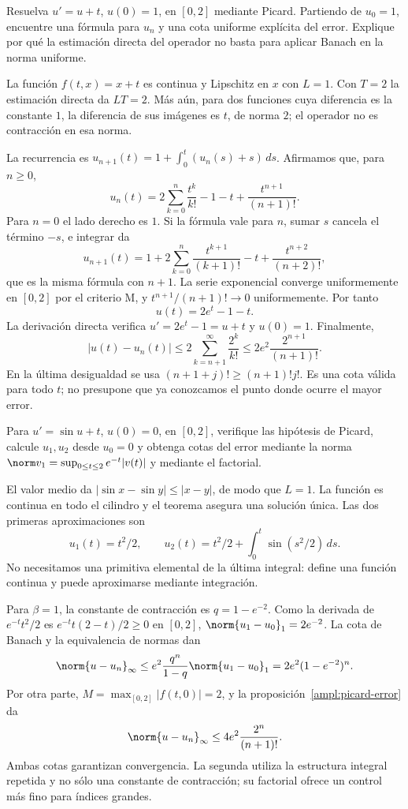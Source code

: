 \begin{ejercicio}\label{ej:ampl-picard-1}
Resuelva $u'=u+t$, $u(0)=1$, en $[0,2]$ mediante Picard. Partiendo de $u_0=1$, encuentre una fórmula para $u_n$ y una cota uniforme explícita del error. Explique por qué la estimación directa del operador no basta para aplicar Banach en la norma uniforme.
\end{ejercicio}
\begin{solucion}
La función $f(t,x)=x+t$ es continua y Lipschitz en $x$ con $L=1$. Con $T=2$ la estimación directa da $LT=2$. Más aún, para dos funciones cuya diferencia es la constante $1$, la diferencia de sus imágenes es $t$, de norma $2$; el operador no es contracción en esa norma.

La recurrencia es $u_{n+1}(t)=1+\int_0^t(u_n(s)+s)\,ds$. Afirmamos que, para $n\ge0$,
\[
 u_n(t)=2\sum_{k=0}^n\frac{t^k}{k!}-1-t+\frac{t^{n+1}}{(n+1)!}.
\]
Para $n=0$ el lado derecho es $1$. Si la fórmula vale para $n$, sumar $s$ cancela el término $-s$, e integrar da
\[
 u_{n+1}(t)=1+2\sum_{k=0}^n\frac{t^{k+1}}{(k+1)!}-t
 +\frac{t^{n+2}}{(n+2)!},
\]
que es la misma fórmula con $n+1$. La serie exponencial converge uniformemente en $[0,2]$ por el criterio M, y $t^{n+1}/(n+1)!\to0$ uniformemente. Por tanto
\[
 u(t)=2e^t-1-t.
\]
La derivación directa verifica $u'=2e^t-1=u+t$ y $u(0)=1$. Finalmente,
\[
 |u(t)-u_n(t)|
 \le2\sum_{k=n+1}^{\infty}\frac{2^k}{k!}
 \le2e^2\frac{2^{n+1}}{(n+1)!}.
\]
En la última desigualdad se usa $(n+1+j)!\ge(n+1)!j!$. Es una cota válida para todo $t$; no presupone que ya conozcamos el punto donde ocurre el mayor error.
\end{solucion}

\begin{ejercicio}\label{ej:ampl-picard-2}
Para $u'=\sin u+t$, $u(0)=0$, en $[0,2]$, verifique las hipótesis de Picard, calcule $u_1,u_2$ desde $u_0=0$ y obtenga cotas del error mediante la norma $\norm v_1=\sup_{0\le t\le2}e^{-t}|v(t)|$ y mediante el factorial.
\end{ejercicio}
\begin{solucion}
El valor medio da $|\sin x-\sin y|\le|x-y|$, de modo que $L=1$. La función es continua en todo el cilindro y el teorema asegura una solución única. Las dos primeras aproximaciones son
\[
 u_1(t)=t^2/2,\qquad
 u_2(t)=t^2/2+\int_0^t\sin(s^2/2)\,ds.
\]
No necesitamos una primitiva elemental de la última integral: define una función continua y puede aproximarse mediante integración.

Para $\beta=1$, la constante de contracción es $q=1-e^{-2}$. Como la derivada de $e^{-t}t^2/2$ es $e^{-t}t(2-t)/2\ge0$ en $[0,2]$,
$\norm{u_1-u_0}_1=2e^{-2}$. La cota de Banach y la equivalencia de normas dan
\[
 \norm{u-u_n}_\infty
 \le e^2\frac{q^n}{1-q}\norm{u_1-u_0}_1
 =2e^2(1-e^{-2})^n.
\]
Por otra parte, $M=\max_{[0,2]}|f(t,0)|=2$, y la proposición~\ref{ampl:picard-error} da
\[
 \norm{u-u_n}_\infty\le4e^2\frac{2^n}{(n+1)!}.
\]
Ambas cotas garantizan convergencia. La segunda utiliza la estructura integral repetida y no sólo una constante de contracción; su factorial ofrece un control más fino para índices grandes.
\end{solucion}

